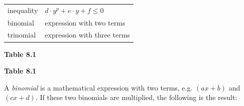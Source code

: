 \begin{table}[H]
\begin{center}
\begin{xtabular}[t]{|l|l|}
        inequality &
                  $d\ensuremath{\cdot}{y}^{p}+e\ensuremath{\cdot}y+f\leq 0$
     \tabularnewline{}
        binomial &
        expression with two terms%
     \tabularnewline{}
        trinomial &
        expression with three terms%
     \tabularnewline{}
    \end{xtabular}
      \end{center}
    \begin{center}{\small\bfseries Table 8.1}\end{center}
    \begin{caption}{\small\bfseries Table 8.1}\end{caption}
\end{table}
    \par
      \label{m39383*uid4}
            \nopagebreak
        \label{m39383*id268015}A \textsl{binomial} is a mathematical expression with two terms, e.g. $\left(ax+b\right)$ and $\left(cx+d\right)$. If these two binomials are multiplied, the following is the result:\par 
        \label{m39383*id268064}\nopagebreak\noindent{}
